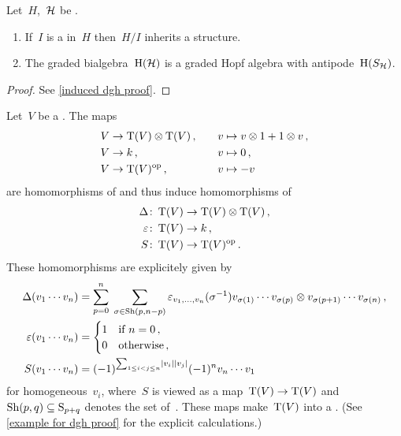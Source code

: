 \documentclass[a4paper,10pt,headings=standardclasses]{scrartcl}
\begin{document}
\begin{proposition}
  \label{induced dgh}
  Let~$H$,~$\mathcal{H}$ be {\dghs}.
  \begin{enumerate}
    \item
      If~$I$ is a {\dghi} in~$H$ then~$H/I$ inherits a {\dgh} structure.
    \item
      The graded bialgebra~$\operatorname{H}(\mathcal{H})$ is a graded Hopf algebra with antipode~$\operatorname{H}(S_{\mathcal{H}})$.
  \end{enumerate}
\end{proposition}

\begin{proof}
  See \cref{induced dgh proof}.
\end{proof}

\begin{example}
  \label{example for dgh}
  Let~$V$ be a {\dgv}.
  The maps
  \begin{alignat*}{3}
    V
    &\to
    \operatorname{T}(V) \otimes \operatorname{T}(V) \,,
    &
    \quad
    v
    &\mapsto
    v \otimes 1 + 1 \otimes v \,,
    \\
    V
    &\to
    k \,,
    &
    \quad
    v
    &\mapsto
    0 \,,
    \\
    V
    &\to
    \operatorname{T}(V)^{\mathrm{op}} \,,
    &
    \quad
    v
    &\mapsto
    -v
  \end{alignat*}
  are homomorphisms of {\dgvs} and thus induce homomorphisms of {\dgas}
  \begin{align*}
    \Delta
    \colon
    \operatorname{T}(V)
    &\to
    \operatorname{T}(V) \otimes \operatorname{T}(V) \,,
    \\
    \varepsilon
    \colon
    \operatorname{T}(V)
    &\to
    k \,,
    \\
    S
    \colon
    \operatorname{T}(V)
    &\to
    \operatorname{T}(V)^{\mathrm{op}} \,.
  \end{align*}
  These homomorphisms are explicitely given by
  \begin{align*}
    \Delta(v_1 \dotsm v_n)
    &=
    \sum_{p=0}^n
    \;
    \sum_{\sigma \in \operatorname{Sh}(p,n-p)}
    \varepsilon_{v_1, \dotsc, v_n}(\sigma^{-1})
    v_{\sigma(1)} \dotsm v_{\sigma(p)}
    \otimes
    v_{\sigma(p+1)} \dotsm v_{\sigma(n)} \,,
    \\
    \varepsilon( v_1 \dotsm v_n )
    &=
    \begin{cases}
      1 & \text{if~$n = 0$} \,, \\
      0 & \text{otherwise} \,,
    \end{cases}
    \\
    S(v_1 \dotsm v_n)
    &=
    (-1)^{\sum_{1 \leq i < j \leq n} \lvert v_i\rvert \lvert v_j\rvert}
    (-1)^n
    v_n \dotsm v_1
  \end{align*}
  for homogeneous~$v_i$, where~$S$ is viewed as a map~$\operatorname{T}(V) \to \operatorname{T}(V)$ and~$\operatorname{Sh}(p,q) \subseteq \operatorname{S}_{p+q}$ denotes the set of~{}.
  These maps make~$\operatorname{T}(V)$ into a {\dgh}.
  (See \cref{example for dgh proof} for the explicit calculations.)
\end{example}
\end{document}
